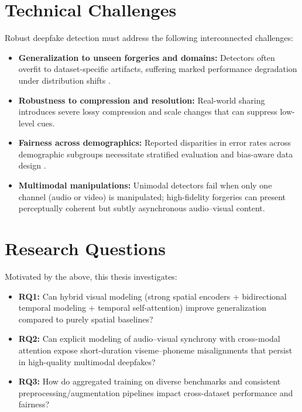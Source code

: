 \section{Technical Challenges}
Robust deepfake detection must address the following interconnected challenges:
\begin{itemize}
    \item \textbf{Generalization to unseen forgeries and domains:} Detectors often overfit to dataset-specific artifacts, suffering marked performance degradation under distribution shifts \cite{mubarak2023survey,rossler2019faceforensics}.
    \item \textbf{Robustness to compression and resolution:} Real-world sharing introduces severe lossy compression and scale changes that can suppress low-level cues.
    \item \textbf{Fairness across demographics:} Reported disparities in error rates across demographic subgroups necessitate stratified evaluation and bias-aware data design \cite{mubarak2023survey}.
    \item \textbf{Multimodal manipulations:} Unimodal detectors fail when only one channel (audio or video) is manipulated; high-fidelity forgeries can present perceptually coherent but subtly asynchronous audio–visual content.
\end{itemize}

\section{Research Questions}
Motivated by the above, this thesis investigates:
\begin{itemize}
    \item \textbf{RQ1:} Can hybrid visual modeling (strong spatial encoders + bidirectional temporal modeling + temporal self-attention) improve generalization compared to purely spatial baselines?
    \item \textbf{RQ2:} Can explicit modeling of audio–visual synchrony with cross-modal attention expose short-duration viseme–phoneme misalignments that persist in high-quality multimodal deepfakes?
    \item \textbf{RQ3:} How do aggregated training on diverse benchmarks and consistent preprocessing/augmentation pipelines impact cross-dataset performance and fairness?
\end{itemize}

